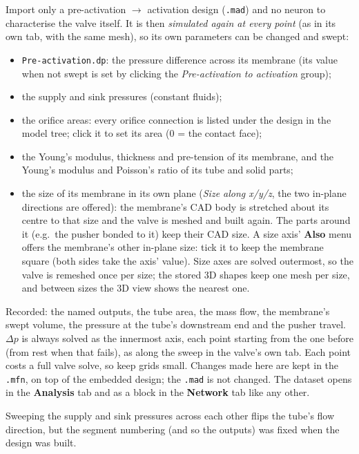 \documentclass[11pt,a4paper]{article}
\newcommand{\code}[1]{\texttt{#1}}
\newcommand{\menu}[1]{\textsf{\textbf{#1}}}
\begin{document}
Import only a pre-activation $\to$ activation design (\code{.mad}) and no neuron to characterise the valve itself.
It is then \emph{simulated again at every point} (as in its own tab, with the same mesh), so its own parameters can be
changed and swept:
\begin{itemize}
\item \code{Pre-activation.dp}: the pressure difference across its membrane (its value when not swept is set by
  clicking the \emph{Pre-activation to activation} group);
\item the supply and sink pressures (constant fluids);
\item the orifice areas: every orifice connection is listed under the design in the model tree; click it to set its
  area (0 = the contact face);
\item the Young's modulus, thickness and pre-tension of its membrane, and the Young's modulus and Poisson's ratio of
  its tube and solid parts;
\item the size of its membrane in its own plane (\emph{Size along x/y/z}, the two in-plane directions are offered):
  the membrane's CAD body is stretched about its centre to that size and the valve is meshed and built again. The
  parts around it (e.g.\ the pusher bonded to it) keep their CAD size. A size axis' \menu{Also} menu offers the
  membrane's other in-plane size: tick it to keep the membrane square (both sides take the axis' value). Size axes
  are solved outermost, so the valve is
  remeshed once per size; the stored 3D shapes keep one mesh per size, and between sizes the 3D view shows the
  nearest one.
\end{itemize}
Recorded: the named outputs, the tube area, the mass flow, the membrane's swept volume, the pressure at the tube's
downstream end and the pusher travel. $\Delta p$ is always solved as the innermost axis, each point starting from the
one before (from rest when that fails), as along the sweep in the valve's own tab. Each point costs a full valve
solve, so keep grids small. Changes made here are kept in the \code{.mfn}, on top of the embedded design; the
\code{.mad} is not changed. The dataset opens in the \menu{Analysis} tab and as a block in the \menu{Network} tab like
any other.

\begin{warn}
Sweeping the supply and sink pressures across each other flips the tube's flow direction, but the segment numbering
(and so the outputs) was fixed when the design was built.
\end{warn}
\end{document}
